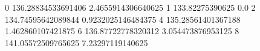 0 136.28834533691406 2.4655914306640625
1 133.82275390625 0.0
2 134.74595642089844 0.9232025146484375
4 135.28561401367188 1.462860107421875
6 136.87722778320312 3.054473876953125
8 141.05572509765625 7.23297119140625
